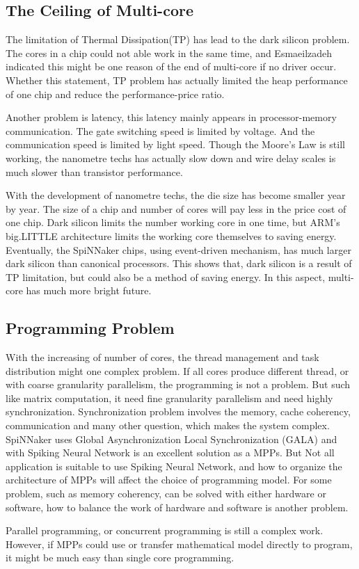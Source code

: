 \subsection{The Ceiling of Multi-core}
The limitation of Thermal Dissipation(TP) has lead to the dark silicon\cite{esmaeilzadeh2011dark} problem\cite{taylor2012dark}. The cores in a chip could not able work in the same time, and Esmaeilzadeh indicated this might be one reason of the end of multi-core if no driver occur\cite{emer2002asim}. Whether this statement, TP problem has actually limited the heap performance of one chip and reduce the performance-price ratio.
\par 
Another problem is latency, this latency mainly appears in processor-memory communication\cite{hennessy2017computer}. The gate switching speed is limited by voltage. And the communication speed is limited by light speed. Though the Moore’s Law is still working, the nanometre techs has actually slow down and wire delay scales is much slower than transistor performance\cite{hennessy2017computer}.
\par 
With the development of nanometre techs, the die size has become smaller year by year. The size of a chip and number of cores will pay less in the price cost of one chip. Dark silicon limits the number working core in one time, but ARM’s big.LITTLE architecture limits the working core themselves to saving energy. Eventually, the SpiNNaker chips, using event-driven mechanism, has much larger dark silicon than canonical processors. This shows that, dark silicon is a result of TP limitation, but could also be a method of saving energy. In this aspect, multi-core has much more bright future.

\subsection{Programming Problem}
With the increasing of number of cores, the thread management and task distribution might one complex problem. If all cores produce different thread, or with coarse granularity parallelism, the programming is not a problem. But such like matrix computation, it need fine granularity parallelism and need highly synchronization. Synchronization problem involves the memory, cache coherency, communication and many other question, which makes the system complex. SpiNNaker uses Global Asynchronization Local Synchronization (GALA) and with Spiking Neural Network is an excellent solution as a MPPs. But Not all application is suitable to use Spiking Neural Network, and how to organize the architecture of MPPs will affect the choice of programming model. For some problem, such as memory coherency, can be solved with either hardware or software, how to balance the work of hardware and software is another problem.
\par 
Parallel programming, or concurrent programming is still a complex work. However, if MPPs could use or transfer mathematical model directly to program, it might be much easy than single core programming. 

